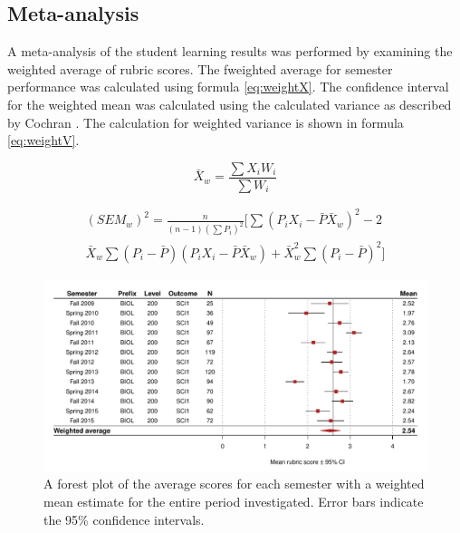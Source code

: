 \documentclass[fleqn,10pt]{SelfArx}\usepackage[]{graphicx}\usepackage[]{color}
\begin{document}
\lipsum[1]
\subsection{Meta-analysis}
A meta-analysis of the student learning results was performed by examining the weighted average of rubric scores. The fweighted average for semester performance was calculated using formula \ref{eq:weightX}. The confidence interval for the weighted mean was calculated using the calculated variance as described by Cochran \citep{Cochran1977}. The calculation for weighted variance is shown in formula \ref{eq:weightV}.

\begin{equation}
\bar{X}_w = \frac{\sum X_i W_i}{\sum W_i}
\label{eq:weightX}
\end{equation}

\begin{equation}
\begin{split}
(SEM_w)^2 = \frac{n}{(n-1)(\sum P_i)^2}\big[ \sum(P_i X_i - \bar{P}\bar{X}_w)^2 - 2 \\
\bar{X}_w \sum(P_i - \bar{P})(P_i X_ i - \bar{P} \bar{X}_w) + \bar{X}_w^2 \sum(P_i - \bar{P})^2 \big]
\label{eq:weightV}
\end{split}
\end{equation}

\begin{figure}[htb]\centering %

\includegraphics[width=\textwidth]{./figure/forest}
\protect\caption{A forest plot of the average scores for each semester with a weighted mean estimate for the entire period investigated. Error bars indicate the 95\% confidence intervals.}
\label{fig:forest.pdf}
\end{figure}
\end{document}
